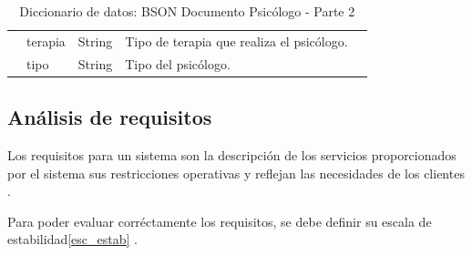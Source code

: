 \begin{table}[htpb]
\begin{tabularx}{\textwidth}{|l|X|X|X|X|}
                   & terapia                                                                                                                                                & String                                                                                                                     & Tipo de terapia que realiza el psicólogo.                                                                                                                                                                                                                                   \\ \cline{2-4} 
                   & tipo                                                                                                                                                   & String                                                                                                                     & Tipo del psicólogo.                                                                                                                                                                                                                                                         \\ \hline
\end{tabularx}
\caption{Diccionario de datos: BSON Documento Psicólogo - Parte 2}
\label{fig:dic_datos_BSON_4}
\end{table}


\subsection{Análisis de requisitos}


Los requisitos para un sistema son la descripción de los servicios proporcionados por el sistema sus restricciones operativas y reflejan las necesidades de los clientes \cite{sommerville}.


Para poder evaluar corréctamente los requisitos, se debe definir su escala de estabilidad\ref{esc_estab} \cite{sommerville}.



